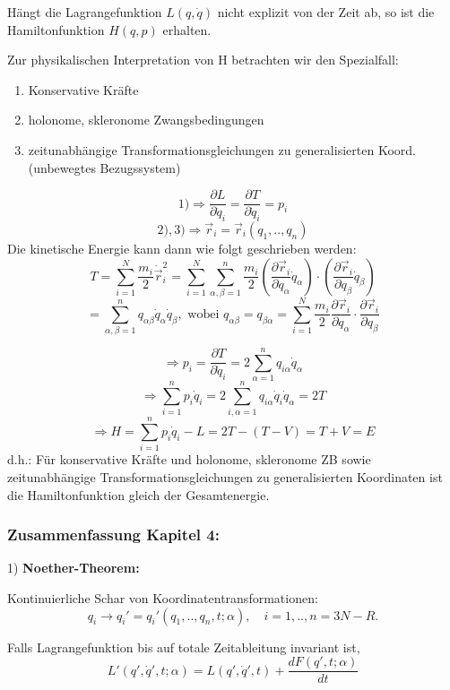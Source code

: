 \documentclass[10pt, letterpaper]{article}
\begin{document}
Hängt die Lagrangefunktion $L(q,\dot{q})$ nicht explizit von der Zeit ab, so ist die Hamiltonfunktion $H(q,p)$ erhalten.

Zur physikalischen Interpretation von H betrachten wir den Spezialfall:
\begin{enumerate}
\item Konservative Kräfte
\item holonome, skleronome Zwangsbedingungen
\item zeitunabhängige Transformationsgleichungen zu generalisierten Koord. (unbewegtes Bezugssystem)
\end{enumerate}
$$1) \Rightarrow \frac{\partial L}{\partial \dot{q}_i} = \frac{\partial T}{\partial \dot{q}_i} = p_i$$
$$2),3) \Rightarrow \vec{r}_i = \vec{r}_i(q_1,..,q_n)$$
Die kinetische Energie kann dann wie folgt geschrieben werden:
\[T = \sum_{i=1}^N \frac{m_i}{2}\dot{\vec{r}}_i^2 = \sum_{i=1}^N \sum_{\alpha,\beta=1}^n \frac{m_i}{2}\left(\frac{\partial \vec{r}_i}{\partial q_\alpha}\dot{q}_\alpha\right)\cdot\left(\frac{\partial \vec{r}_i}{\partial q_\beta}\dot{q}_\beta\right)\]
\[= \sum_{\alpha,\beta=1}^n q_{\alpha\beta}\dot{q}_\alpha\dot{q}_\beta, \text{ wobei } q_{\alpha\beta} = q_{\beta\alpha} = \sum_{i=1}^N \frac{m_i}{2}\frac{\partial \vec{r}_i}{\partial q_\alpha}\cdot\frac{\partial \vec{r}_i}{\partial q_\beta}\]

$$\Rightarrow p_i = \frac{\partial T}{\partial \dot{q}_i} = 2\sum_{\alpha=1}^n q_{i\alpha}\dot{q}_\alpha$$
$$\Rightarrow \sum_{i=1}^n p_i\dot{q}_i = 2\sum_{i,\alpha=1}^n q_{i\alpha}\dot{q}_i\dot{q}_\alpha = 2T$$
$$\Rightarrow H = \sum_{i=1}^n p_i\dot{q}_i - L = 2T-(T-V) = T+V = E$$
d.h.: Für konservative Kräfte und holonome, skleronome ZB sowie zeitunabhängige Transformationsgleichungen zu generalisierten Koordinaten ist die Hamiltonfunktion gleich der Gesamtenergie.




\subsubsection{Zusammenfassung Kapitel 4:}

1) \textbf{Noether-Theorem:}

Kontinuierliche Schar von Koordinatentransformationen:
\[q_i \to q_i' = q_i'(q_1,..,q_n,t;\alpha), \quad i=1,..,n=3N-R.\]

Falls Lagrangefunktion bis auf totale Zeitableitung invariant ist,
\[L'(q',\dot{q}',t;\alpha) = L(q',\dot{q}',t) + \frac{dF(q',t;\alpha)}{dt}\]
\end{document}
